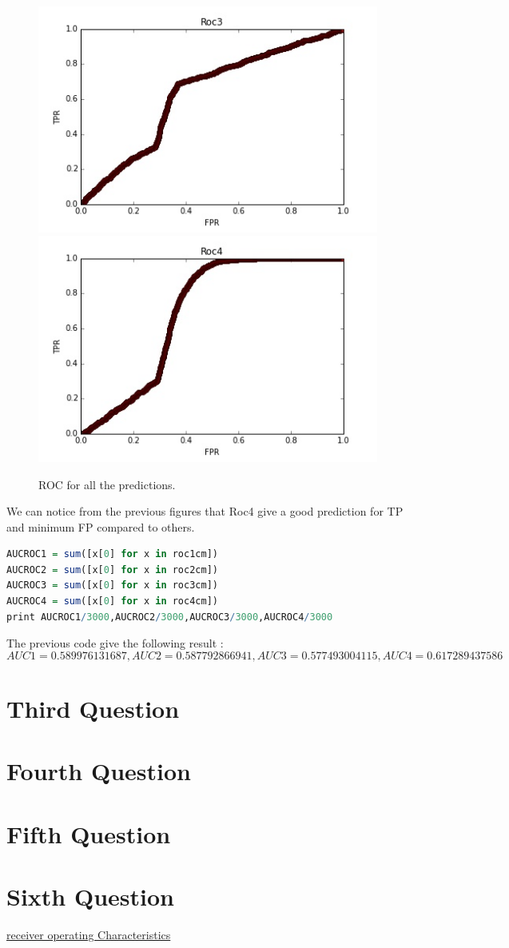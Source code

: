 \documentclass{article}
\begin{document}
\begin{figure}[H]
	\includegraphics[scale=0.58]{roc3.jpg}		\includegraphics[scale=0.58]{roc4.jpg}
	\caption{ROC for all the predictions.}
\end{figure}
We can notice from the previous figures that Roc4 give a good prediction for TP and minimum FP compared to others.

\begin{lstlisting}[language=R]
AUCROC1 = sum([x[0] for x in roc1cm])
AUCROC2 = sum([x[0] for x in roc2cm])
AUCROC3 = sum([x[0] for x in roc3cm])
AUCROC4 = sum([x[0] for x in roc4cm])
print AUCROC1/3000,AUCROC2/3000,AUCROC3/3000,AUCROC4/3000
\end{lstlisting}
The previous code give the following result :
\[AUC1=0.589976131687,AUC2= 0.587792866941,AUC3= 0.577493004115,AUC4= 0.617289437586\]
\section*{Third Question}

\section*{Fourth Question}
\section*{Fifth Question}
\section*{Sixth Question}
\begin{thebibliography}{9}
	\href{https://en.wikipedia.org/wiki/Receiver_operating_characteristic}{receiver operating Characteristics }
\end{thebibliography}
\end{document}
